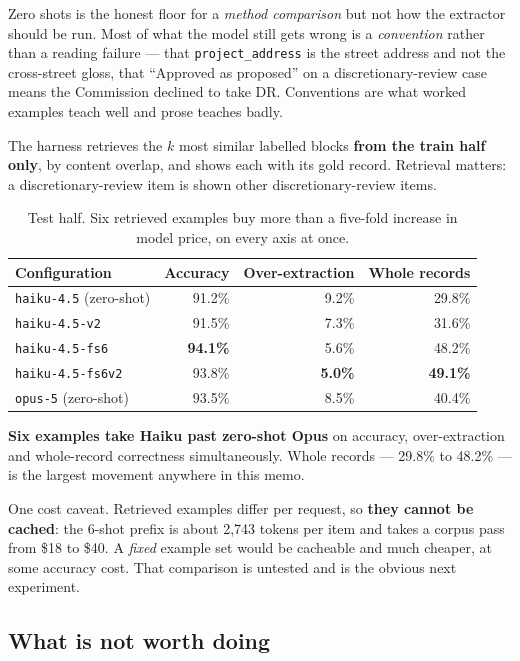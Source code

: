 \documentclass[11pt]{article}
\begin{document}
Zero shots is the honest floor for a \emph{method comparison} but not how the extractor should
be run. Most of what the model still gets wrong is a \emph{convention} rather than a reading
failure --- that \texttt{project\_address} is the street address and not the cross-street
gloss, that ``Approved as proposed'' on a discretionary-review case means the Commission
declined to take DR. Conventions are what worked examples teach well and prose teaches badly.

The harness retrieves the $k$ most similar labelled blocks \textbf{from the train half only},
by content overlap, and shows each with its gold record. Retrieval matters: a
discretionary-review item is shown other discretionary-review items.

\begin{table}[h]
\centering
\begin{tabular}{lrrr}
\toprule
Configuration & Accuracy & Over-extraction & Whole records \\
\midrule
\texttt{haiku-4.5} (zero-shot)   & 91.2\% & 9.2\% & 29.8\% \\
\texttt{haiku-4.5-v2}            & 91.5\% & 7.3\% & 31.6\% \\
\texttt{haiku-4.5-fs6}           & \textbf{94.1\%} & 5.6\% & 48.2\% \\
\texttt{haiku-4.5-fs6v2}         & 93.8\% & \textbf{5.0\%} & \textbf{49.1\%} \\
\midrule
\texttt{opus-5} (zero-shot)      & 93.5\% & 8.5\% & 40.4\% \\
\bottomrule
\end{tabular}
\caption{Test half. Six retrieved examples buy more than a five-fold increase in model price,
on every axis at once.}
\end{table}

\textbf{Six examples take Haiku past zero-shot Opus} on accuracy, over-extraction and
whole-record correctness simultaneously. Whole records --- 29.8\% to 48.2\% --- is the largest
movement anywhere in this memo.

One cost caveat. Retrieved examples differ per request, so \textbf{they cannot be cached}: the
6-shot prefix is about 2{,}743 tokens per item and takes a corpus pass from \$18 to \$40. A
\emph{fixed} example set would be cacheable and much cheaper, at some accuracy cost. That
comparison is untested and is the obvious next experiment.

\subsection{What is not worth doing}
\end{document}
